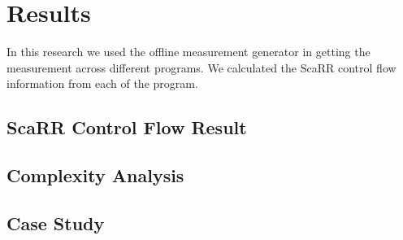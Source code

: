 
\chapter{Results} %

\label{Chapter5} %

In this research we used the offline measurement generator in getting the measurement across different programs. We calculated the ScaRR control flow information from each of the program.

\section{ScaRR Control Flow Result}

\section{Complexity Analysis}

\section{Case Study}